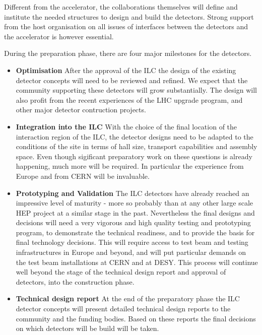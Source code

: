 \documentclass[%
 reprint,
 amsmath,amssymb,
 aps,
]{revtex4-1}
\begin{document}
Different from the accelerator, the collaborations themselves will define and institute the needed structures to design and build the detectors. Strong support from the host organisation on all issues of interfaces between the detectors and the accelerator is however essential. 

During the preparation phase, there are four major milestones for the
detectors.
\begin{itemize}

\item{\bfseries Optimisation} After the approval of the ILC the design of the existing detector concepts will need to be reviewed and refined. We expect that the community supporting these detectors will grow substantially. The design will also profit from the recent experiences of the LHC upgrade program, and other major detector contruction projects. 

\item{\bfseries Integration into the ILC}
With the choice of the final location of the interaction region of the ILC, the detector designs need to be adapted to the
conditions of the site in terms of hall size, transport capabilities and
assembly space. Even though sigificant preparatory work on these questions is already happening, much more will be required. In particular the experience from Europe and from CERN will be invaluable. 

 
\item{\bfseries Prototyping and Validation}
The ILC detectors have already reached an impressive level of maturity - more so probably than at any other large scale HEP project at a similar stage in the past. Nevertheless the final designs and decisions will need a very vigorous and high quality testing and prototyping program, to demonstrate the technical readiness, and to provide the basis for final technology decisions. This will require access to test beam and testing infrastructures in Europe and beyond, and will put particular demands on the test beam installations at CERN and at DESY. This process will continue well beyond the stage of the technical design report and approval of detectors, into the construction phase.

\item{\bfseries Technical design report}
At the end of the preparatory phase the ILC detector concepts will present detailed technical design reports to the community and the funding bodies. Based on these reports the final decisions on which detectors will be build will be taken. 

\end{itemize}
\end{document}
